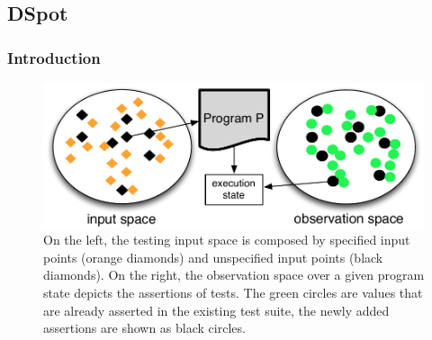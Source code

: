 \documentclass[11pt]{sdm}
\begin{document}
\subsection{DSpot}
\label{testsuite_eval}

\subsubsection{Introduction}
\begin{figure}
  \centering
  \includegraphics[scale=0.5]{io-spaces.pdf}
  \caption{On the left, the testing input space is composed by specified input points (orange diamonds) and unspecified input points (black diamonds). On the right, the observation space over a given program state depicts the assertions of tests. The green circles are values that are already asserted in the existing test suite, the newly added assertions are shown as black circles.}
\label{fig:io-spaces}
\end{figure}
\end{document}
